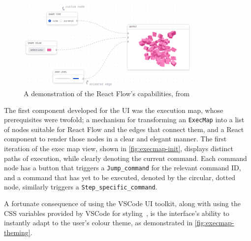 \begin{figure}
  \center{}
  \includegraphics[width=0.8\textwidth]{img/react-flow-demo.png}
  \caption{
    A demonstration of the React Flow's capabilities,
    from~\cite{react-flow}}%
  \label{fig:react-flow}
\end{figure}

The first component developed for the UI was the execution map, whose
prerequisites were twofold; a mechanism for transforming an \texttt{ExecMap}
into a list of nodes suitable for React Flow and the edges that connect them,
and a React component to render those nodes in a clear and elegant manner. The
first iteration of the exec map view, shown in \autoref{fig:execmap-init},
displays distinct paths of execution, while clearly denoting the current
command. Each command node has a button that triggers a \texttt{Jump\_command}
for the relevant command ID, and a command that has yet to be executed, denoted
by the circular, dotted node, similarly triggers a
\texttt{Step\_specific\_command}.

A fortunate consequence of using the VSCode UI toolkit, along with using the CSS
variables provided by VSCode for styling~\cite{vscode-theme}, is the interface's
ability to instantly adapt to the user's colour theme, as demonstrated in
\autoref{fig:execmap-theming}.

